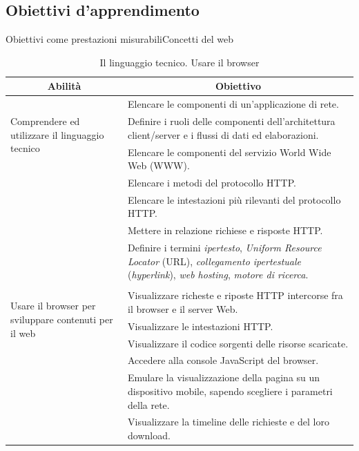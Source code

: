 \documentclass[italian]{beamer}
\begin{document}
\subsection[Obiettivi]{Obiettivi d'apprendimento}
\begin{frame}[allowframebreaks]{Obiettivi come prestazioni misurabili}{Concetti del web}
	
	
	{\tiny
	\begin{table}
		\begin{tabular}{@{}p{}p{}@{}} \toprule
			\multicolumn{1}{c}{Abilit\`a} & \multicolumn{1}{c}{Obiettivo} \\ \midrule
			
			\multirow{3}{*}{\parbox{0.2\textwidth}{Comprendere ed utilizzare il linguaggio tecnico}}
			 & Elencare le componenti di un'applicazione di rete.\\
			 & Definire i ruoli delle componenti dell'architettura client/server e i flussi di dati ed elaborazioni.\\
			 & Elencare le componenti del servizio World Wide Web (WWW).\\
			 & Elencare i metodi del protocollo HTTP.\\
			 & Elencare le intestazioni pi\`u rilevanti del protocollo HTTP. \\
			 & Mettere in relazione richiese e risposte HTTP.\\
			 & Definire i termini \textit{ipertesto}, \textit{Uniform Resource Locator} (URL), \textit{collegamento ipertestuale} (\textit{hyperlink}), \textit{web hosting}, \textit{motore di ricerca}.\\
			 
			 \\
			 
			 \multirow{3}{*}{\parbox{0.2\textwidth}{Usare il browser per sviluppare contenuti per il web}}
			 & Visualizzare richeste e riposte HTTP intercorse fra il browser e il server Web.\\
			 & Visualizzare le intestazioni HTTP.\\
			 & Visualizzare il codice sorgenti delle risorse scaricate.\\
			 & Accedere alla console JavaScript del browser.\\
			 & Emulare la visualizzazione della pagina su un dispositivo mobile, sapendo scegliere i parametri della rete.\\
			 & Visualizzare la timeline delle richieste e del loro download.\\ \bottomrule
		\end{tabular}
		\caption{Il linguaggio tecnico. Usare il browser}
	\end{table}
	}
	

\end{frame}
\end{document}
